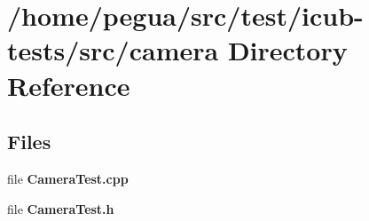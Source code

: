 \section{/home/pegua/src/test/icub-\/tests/src/camera Directory Reference}
\label{dir_34519bff5ae72130fe71a8620cbf1fc0}
\subsection*{Files}
\begin{DoxyCompactItemize}
\item 
file {\bfseries Camera\-Test.\-cpp}
\item 
file {\bfseries Camera\-Test.\-h}
\end{DoxyCompactItemize}
